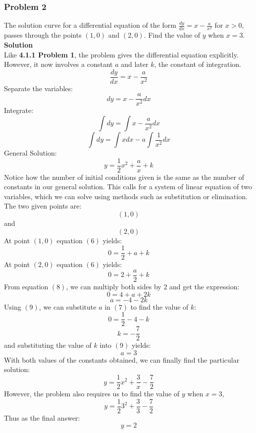 \documentclass[hidelinks, a4paper, 12pt]{article}
\begin{document}
            \subsubsection{Problem 2}
                The solution curve for a differential equation of the form $\frac{dy}{dx} = x - \frac{a}{x^2}$ for $x > 0$,
                passes through the points $(1, 0)$ and $(2, 0)$. Find the value of $y$ when $x = 3$.\\[\baselineskip]
                \textbf{Solution}\\
                Like \textbf{4.1.1 Problem 1}, the problem gives the differential equation explicitly. However, it now involves a constant $a$
                and later $k$, the constant of integration.
                \[\frac{dy}{dx} = x - \frac{a}{x^2}\]
                Separate the variables:
                \[dy = x - \frac{a}{x^2}dx\]
                Integrate:
                \[\int dy = \int x - \frac{a}{x^2}dx\]
                \[\int dy = \int xdx -a \int \frac{1}{x^2}dx\]
                General Solution:
                \begin{equation}
                    y = \frac{1}{2}x^2 + \frac{a}{x} + k   
                \end{equation}
                Notice how the number of initial conditions given is the same as the number of constants in our general solution. This calls
                for a system of linear equation of two variables, which we can solve using methods such as substitution or elimination. The two 
                given points are:
                \[(1, 0)\] and \[(2, 0)\]
                At point $(1, 0)$ equation $(6)$ yields:
                \begin{equation}
                    0 = \frac{1}{2} + a + k
                \end{equation}
                At point $(2, 0)$ equation $(6)$ yields:
                \begin{equation}
                    0 = 2 + \frac{a}{2} + k
                \end{equation}
                From equation $(8)$, we can multiply both sides by $2$ and get the expression:
                \[0 = 4 + a + 2k\]
                \begin{equation}
                    a = -4 -2k
                \end{equation}
                Using $(9)$, we can substitute $a$ in $(7)$ to find the value of $k$:
                \[0 = \frac{1}{2} - 4 - k\]
                \[k = -\frac{7}{2}\]
                and substituting the value of $k$ into $(9)$ yields:
                \[a = 3\]
                With both values of the constants obtained, we can finally find the particular solution:
                \[y = \frac{1}{2}x^2 + \frac{3}{x} - \frac{7}{2}\]
                However, the problem also requires us to find the value of $y$ when $x = 3$,
                \[y = \frac{1}{2}3^2 + \frac{3}{3} - \frac{7}{2}\]
                Thus as the final answer:
                \[y = 2\]
\end{document}
